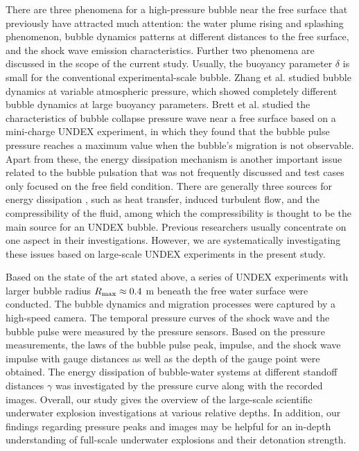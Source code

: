 \documentclass[%
 aip,
 amsmath,amssymb,
 reprint,%
]{revtex4-1}
\begin{document}
There are three phenomena for a high-pressure bubble near the free surface that previously have attracted much attention: the water plume rising and splashing phenomenon, bubble dynamics patterns at different distances to the free surface, and the shock wave emission characteristics. Further two phenomena are discussed in the scope of the current study. Usually, the buoyancy parameter $\delta$ is small for the conventional experimental-scale bubble. Zhang et al.\cite{RN2495} studied bubble dynamics at variable atmospheric pressure, which showed completely different bubble dynamics at large buoyancy parameters. Brett et al.\cite{RN2631} studied the characteristics of bubble collapse pressure wave near a free surface based on a mini-charge UNDEX experiment, in which they found that the bubble pulse pressure reaches a maximum value when the bubble's migration is not observable. Apart from these, the energy dissipation mechanism is another important issue related to the bubble pulsation that was not frequently discussed and test cases only focused on the free field condition\citep{RN2736,RN2622}. There are generally three sources for energy dissipation \citep{RN2475,RN2622}, such as  heat transfer, induced turbulent flow, and the compressibility of the fluid, among which  the compressibility is thought to be the main source for an UNDEX bubble. Previous researchers usually concentrate on one aspect in their investigations. However, we are systematically investigating these issues based on large-scale UNDEX experiments in the present study.

Based on the state of the art stated above, a series of  UNDEX experiments with larger bubble radius $R_{\rm max}\approx 0.4$ m beneath the free water surface were conducted. The bubble dynamics and migration processes were captured by a high-speed camera. The temporal pressure curves of the shock wave and the bubble pulse were measured by the pressure sensors. Based on the pressure measurements, the laws of the bubble pulse peak, impulse, and the shock wave impulse with gauge distances as well as the depth of the gauge point were obtained. The energy dissipation of bubble-water systems at different standoff distances $\gamma$ was investigated by the pressure curve along with the recorded images.  { Overall, our study gives the overview of the large-scale scientific underwater explosion investigations at various relative depths. In addition, our findings regarding pressure peaks and images may be helpful for an in-depth understanding of full-scale underwater explosions and their detonation strength. }
\end{document}
